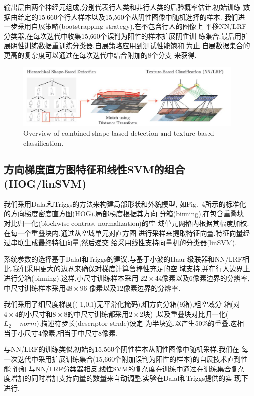 \documentclass[10pt,letterpaper,journal,compsoc]{IEEEtran}
\begin{document}
输出层由两个神经元组成,分别代表行人类和非行人类的后验概率估计.初始训练
数据由给定的15,660个行人样本以及15,560个从阴性图像中随机选择的样本.
我们进一步采用自展策略(bootstrapping strategy),在不包含行人的图像上
平移NN/LRF分类器,在每次迭代中收集15,660个误判为阳性的样本扩展阴性训
练集合.最后用扩展阴性训练数据重训练分类器.自展策略应用到测试性能饱和
为止.自展数据集合的更高的复杂度可以通过在每次迭代中结合附加的8个分支
来获得.

\begin{figure}[!t]
\centering
\includegraphics[width=7in]{fig5.JPG}
\caption{Overview of combined shape-based detection and texture-based classification.}
\end{figure}

\subsection{方向梯度直方图特征和线性SVM的组合(HOG/linSVM)}
我们采用Dalal和Triggs的方法\cite{bib11}来构建局部形状和外貌模型,
如Fig.~4所示的标准化的方向梯度密度直方图(HOG).局部梯度根据其方向
分箱(binning),在包含重叠块对比归一化(blockwise contrast normalization)的空
域单元网格内根据其幅度加权.在每一个重叠块内,通过从空域单元对直方图
进行采样来提取特征向量.特征向量经过串联生成最终特征向量,然后递交
给采用线性支持向量机的分类器(linSVM).


系统参数的选择基于Dalal和Triggs的建议\cite{bib11}.与基于小波的Haar
级联器和NN/LRF相比,我们采用更大的边界来确保对梯度计算鲁棒性充足的空
域支持,并在行人边界上进行分箱(binning).这样,小尺寸训练样本采用
$22\times44$像素以及6像素边界的分辨率,中尺寸训练样本采用$48\times96$
像素以及12像素边界的分辨率.

我们采用了细尺度梯度((-1,0,1)无平滑化掩码),细方向分箱(9箱),粗空域分
箱(对$4\times4$的小尺寸和$8\times8$的中尺寸训练都采用$2\times2$块)
,以及重叠块对比归一化($L_2-norm$).描述符步长(descriptor stride)设定
为半块宽,以产生50\%的重叠.这相当于小尺寸4像素,相当于中尺寸8像素.

与NN/LRF的训练类似,初始的15,560个阴性样本从阴性图像中随机采样.我们在
每一次迭代中采用扩展训练集合(15,660个附加误判为阳性的样本)的自展技术直到性能
饱和.与NN/LRF分类器相反,线性SVM的复杂度在训练中通过在训练集合复杂
度增加的同时增加支持向量的数量来自动调整.实验在Dalal和Triggs提供的实
现\cite{bib11}下进行.
\end{document}
